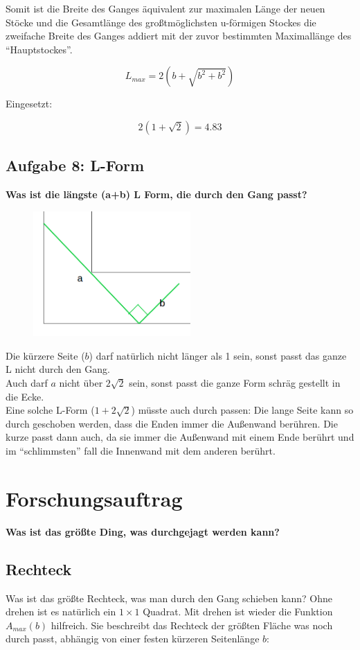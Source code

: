 \documentclass[a4paper,11pt]{article}
\begin{document}
Somit ist die Breite des Ganges äquivalent zur maximalen Länge der neuen Stöcke und die Gesamtlänge des großtmöglichsten u-förmigen Stockes die zweifache Breite des Ganges addiert mit der zuvor bestimmten Maximallänge des “Hauptstockes”.

\[ L_{max} = 2(b+\sqrt{b^2+b^2}) \]

Eingesetzt:

\[ 2(1+\sqrt{2})=4.83 \]

\subsection{Aufgabe 8: L-Form}
\textbf{Was ist die l\"angste (a+b) L Form, die durch den Gang passt?} \\

\begin{figure}[htbp] 
        \centering
        \includegraphics[width=6cm]{img/A8_1.png}
\end{figure}

Die kürzere Seite ($b$) darf natürlich nicht länger als 1 sein, sonst passt das ganze L nicht durch den Gang. \\
Auch darf $a$ nicht \"uber $2\sqrt{2}$ sein, sonst passt die ganze Form schräg gestellt in die Ecke. \\
Eine solche L-Form ($1+2\sqrt{2}$) müsste auch durch passen: Die lange Seite kann so durch geschoben werden, dass die Enden immer die Außenwand berühren. Die kurze passt dann auch, da sie immer die Außenwand mit einem Ende berührt und im ``schlimmsten'' fall die Innenwand mit dem anderen berührt.

\section{Forschungsauftrag}
\textbf{Was ist das größte Ding, was durchgejagt werden kann?}

\subsection{Rechteck}
Was ist das größte Rechteck, was man durch den Gang schieben kann? Ohne drehen ist es natürlich ein $1\times 1$ Quadrat. Mit drehen ist wieder die Funktion $A_{max}(b)$ hilfreich. Sie beschreibt das Rechteck der größten Fläche was noch durch passt, abhängig von einer festen kürzeren Seitenlänge $b$:
\end{document}
